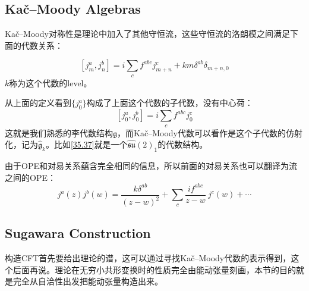 \subsection{Ka\v{c}\mbox{–}Moody Algebras}
Ka\v{c}\mbox{–}Moody对称性是理论中加入了其他守恒流，这些守恒流的洛朗模之间满足下面的代数关系：
\begin{definition}
	\begin{equation}\label{38.1}
		\boxed{
			\left[j_m^a,j_n^b\right]=i\sum_cf^{abc}j_{m+n}^c+k m\delta^{ab}\delta_{m+n,0}
		}
	\end{equation}
	$k$称为这个代数的level。
\end{definition}
从上面的定义看到$\{j_0^a\}$构成了上面这个代数的子代数，没有中心荷：
\begin{equation}\label{38.2}
	\left[j_0^a,j_0^b\right]=i\sum_cf^{abc}j_0^c
\end{equation}
这就是我们熟悉的李代数结构$\mathfrak{g}$，而Ka\v{c}\mbox{–}Moody代数可以看作是这个子代数的仿射化，记为$\hat{\mathfrak{g}}_k$。比如\ref{35.37}就是一个$\widehat{\mathfrak{su}}(2)_{1}$的代数结构。
\begin{theorem}
	由于OPE和对易关系蕴含完全相同的信息，所以前面的对易关系也可以翻译为流之间的OPE：
	\begin{equation}\label{38.3}
		\boxed{
			j^a(z)j^b(w)=\frac {k\delta^{ab}}{(z-w)^2}+\sum_c\frac{if^{abc}}{z-w}~j^c(w)+\cdots 
		}
	\end{equation}
\end{theorem}

\subsection{Sugawara Construction}
构造CFT首先要给出理论的谱，这可以通过寻找Ka\v{c}\mbox{–}Moody代数的表示得到，这个后面再说。理论在无穷小共形变换时的性质完全由能动张量刻画，本节的目的就是完全从自洽性出发把能动张量构造出来。

